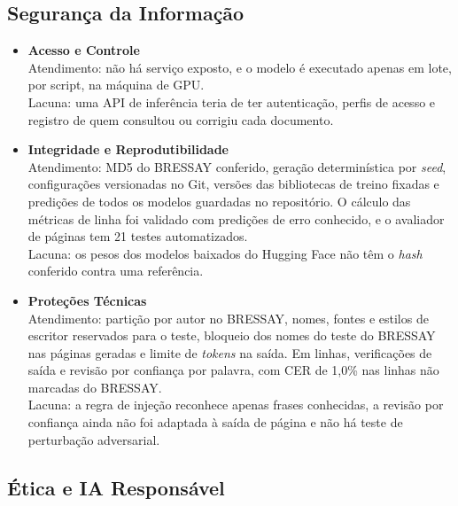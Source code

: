 \documentclass[12pt,a4paper]{article}
\begin{document}
\subsection{Segurança da Informação}

\begin{itemize}
    \item \textbf{Acesso e Controle} \\
    Atendimento: não há serviço exposto, e o modelo é executado apenas em lote, por script, na máquina de GPU. \\
    Lacuna: uma API de inferência teria de ter autenticação, perfis de acesso e registro de quem consultou ou corrigiu cada documento.

    \item \textbf{Integridade e Reprodutibilidade} \\
    Atendimento: MD5 do BRESSAY conferido, geração determinística por \emph{seed}, configurações versionadas no Git, versões das bibliotecas de treino fixadas e predições de todos os modelos guardadas no repositório. O cálculo das métricas de linha foi validado com predições de erro conhecido, e o avaliador de páginas tem 21 testes automatizados. \\
    Lacuna: os pesos dos modelos baixados do Hugging Face não têm o \emph{hash} conferido contra uma referência.

    \item \textbf{Proteções Técnicas} \\
    Atendimento: partição por autor no BRESSAY, nomes, fontes e estilos de escritor reservados para o teste, bloqueio dos nomes do teste do BRESSAY nas páginas geradas e limite de \emph{tokens} na saída. Em linhas, verificações de saída e revisão por confiança por palavra, com CER de 1,0\% nas linhas não marcadas do BRESSAY. \\
    Lacuna: a regra de injeção reconhece apenas frases conhecidas, a revisão por confiança ainda não foi adaptada à saída de página e não há teste de perturbação adversarial.
\end{itemize}

\subsection{Ética e IA Responsável}
\end{document}

